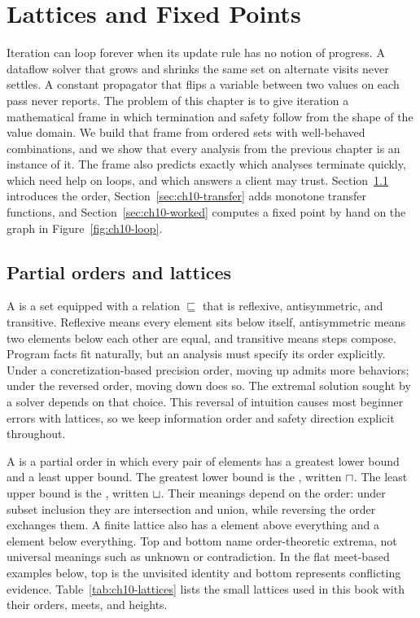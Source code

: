 \chapter{Lattices and Fixed Points}
\label{ch:ch10-lattices-fixed-points}

Iteration can loop forever when its update rule has no notion of progress.
A dataflow solver that grows and shrinks the same set on alternate visits never settles.
A constant propagator that flips a variable between two values on each pass never reports.
The problem of this chapter is to give iteration a mathematical frame in which termination and safety follow from the shape of the value domain.
We build that frame from ordered sets with well-behaved combinations, and we show that every analysis from the previous chapter is an instance of it.
The frame also predicts exactly which analyses terminate quickly, which need help on loops, and which answers a client may trust.
Section~\ref{sec:ch10-order} introduces the order, Section~\ref{sec:ch10-transfer} adds monotone transfer functions, and Section~\ref{sec:ch10-worked} computes a fixed point by hand on the graph in Figure~\ref{fig:ch10-loop}.

\section{Partial orders and lattices}
\label{sec:ch10-order}

A  is a set equipped with a relation $\sqsubseteq$ that is reflexive, antisymmetric, and transitive.
Reflexive means every element sits below itself, antisymmetric means two elements below each other are equal, and transitive means steps compose.
Program facts fit naturally, but an analysis must specify its order explicitly.
Under a concretization-based precision order, moving up admits more behaviors; under the reversed order, moving down does so.
The extremal solution sought by a solver depends on that choice.
This reversal of intuition causes most beginner errors with lattices, so we keep information order and safety direction explicit throughout.

A  is a partial order in which every pair of elements has a greatest lower bound and a least upper bound.
The greatest lower bound is the , written $\sqcap$.
The least upper bound is the , written $\sqcup$.
Their meanings depend on the order: under subset inclusion they are intersection and union, while reversing the order exchanges them.
A finite lattice also has a  element above everything and a  element below everything.
Top and bottom name order-theoretic extrema, not universal meanings such as unknown or contradiction.
In the flat meet-based examples below, top is the unvisited identity and bottom represents conflicting evidence.
Table~\ref{tab:ch10-lattices} lists the small lattices used in this book with their orders, meets, and heights.

